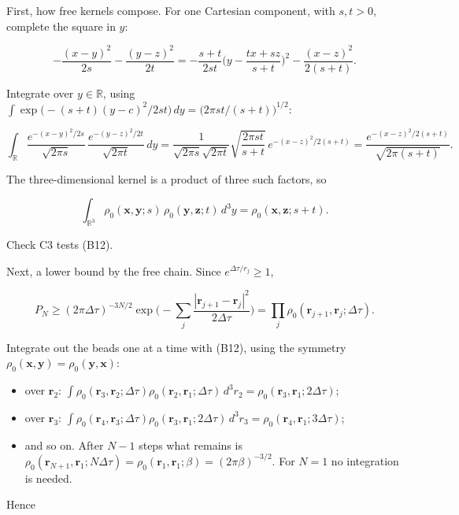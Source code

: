 \documentclass[11pt,a4paper]{article}
\newcommand{\tagmark}[1]{\marginnote{\scriptsize\ttfamily #1}}
\providecommand{\tightlist}{\setlength{\itemsep}{0pt}\setlength{\parskip}{0pt}}
\begin{document}
\tagmark{[D]} First, how free kernels compose. For one Cartesian component, with \(s,t>0\), complete the square in \(y\):

\[
-\frac{(x-y)^2}{2s}-\frac{(y-z)^2}{2t}=-\frac{s+t}{2st}\Big(y-\frac{tx+sz}{s+t}\Big)^2-\frac{(x-z)^2}{2(s+t)} .
\]

Integrate over \(y\in\mathbb R\), using \(\int\exp\!\big(-(s+t)(y-c)^2/2st\big)\,dy=\big(2\pi st/(s+t)\big)^{1/2}\):

\[
\int_{\mathbb R}\frac{e^{-(x-y)^2/2s}}{\sqrt{2\pi s}}\,\frac{e^{-(y-z)^2/2t}}{\sqrt{2\pi t}}\,dy=\frac{1}{\sqrt{2\pi s}\sqrt{2\pi t}}\sqrt{\frac{2\pi st}{s+t}}\,e^{-(x-z)^2/2(s+t)}=\frac{e^{-(x-z)^2/2(s+t)}}{\sqrt{2\pi(s+t)}} .
\]

The three-dimensional kernel is a product of three such factors, so

\begin{equation}
\int_{\mathbb R^3}\rho_0(\mathbf x,\mathbf y;s)\,\rho_0(\mathbf y,\mathbf z;t)\,d^3y=\rho_0(\mathbf x,\mathbf z;s+t).\tag{B12}
\end{equation}

Check C3 tests (B12).

\tagmark{[D]} Next, a lower bound by the free chain. Since \(e^{\Delta\tau/r_j}\ge1\),

\[
P_N\ge(2\pi\Delta\tau)^{-3N/2}\exp\Big(-\sum_j\frac{|\mathbf r_{j+1}-\mathbf r_j|^2}{2\Delta\tau}\Big)=\prod_j\rho_0(\mathbf r_{j+1},\mathbf r_j;\Delta\tau).
\]

Integrate out the beads one at a time with (B12), using the symmetry \(\rho_0(\mathbf x,\mathbf y)=\rho_0(\mathbf y,\mathbf x)\):

\begin{itemize}
\tightlist
\item
  over \(\mathbf r_2\): \(\int\rho_0(\mathbf r_3,\mathbf r_2;\Delta\tau)\rho_0(\mathbf r_2,\mathbf r_1;\Delta\tau)\,d^3r_2=\rho_0(\mathbf r_3,\mathbf r_1;2\Delta\tau)\);
\item
  over \(\mathbf r_3\): \(\int\rho_0(\mathbf r_4,\mathbf r_3;\Delta\tau)\rho_0(\mathbf r_3,\mathbf r_1;2\Delta\tau)\,d^3r_3=\rho_0(\mathbf r_4,\mathbf r_1;3\Delta\tau)\);
\item
  and so on. After \(N-1\) steps what remains is \(\rho_0(\mathbf r_{N+1},\mathbf r_1;N\Delta\tau)=\rho_0(\mathbf r_1,\mathbf r_1;\beta)=(2\pi\beta)^{-3/2}\). For \(N=1\) no integration is needed.
\end{itemize}

Hence
\end{document}
